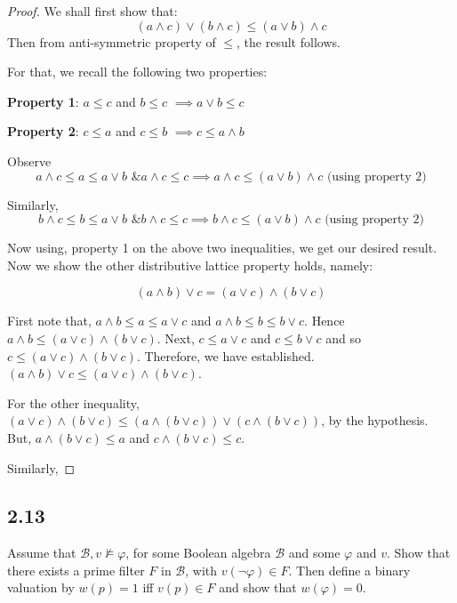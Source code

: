 \documentclass[12pt]{article}
\begin{document}
\begin{proof}
We shall first show that:
$$(a \wedge c) \vee (b \wedge c) \leq (a \vee b) \wedge c$$ 
Then from anti-symmetric property of $\leq$, the result follows.

For that, we recall the following two properties:

\textbf{Property 1}: $a \leq c$ and $b \leq c$ $\implies a \vee b \leq c$

\textbf{Property 2}: $c \leq a$ and $c \leq b$ $\implies c \leq a \wedge b$

Observe 
$$a \wedge c \leq a \leq a \vee b \text{ \& } a \wedge c \leq c \implies a \wedge c \leq (a \vee b) \wedge c \text{ (using property 2)}$$

Similarly,
$$b \wedge c \leq b \leq a \vee b \text{ \& } b \wedge c \leq c \implies b \wedge c \leq (a \vee b) \wedge c \text{ (using property 2)}$$

Now using, property 1 on the above two inequalities, we get our desired result. \\

Now we show the other distributive lattice property holds, namely:

$$(a \wedge b) \vee c = (a \vee c) \wedge (b \vee c)$$

First note that, $a \wedge b \leq a \leq a \vee c$ and $a \wedge b \leq b \leq b \vee c$. Hence $a \wedge b \leq (a \vee c) \wedge (b \vee c)$. Next, $c \leq a \vee c$ and $c \leq b \vee c$ and so $c \leq (a \vee c) \wedge (b \vee c)$. Therefore, we have established. $(a \wedge b) \vee c \leq (a \vee c) \wedge (b \vee c)$.

For the other inequality, $(a \vee c) \wedge (b \vee c) \leq (a \wedge (b \vee c)) \vee (c \wedge (b \vee c))$, by the hypothesis. But, $a \wedge (b \vee c) \leq a$ and $c \wedge (b \vee c) \leq c$.

Similarly, 

\end{proof}

\subsection*{2.13}
Assume that $\mathcal{B}, v \not \vDash \varphi$, for some Boolean algebra $\mathcal{B}$ and some $\varphi$ and $v$. Show that there exists a prime filter $F$ in $\mathcal{B}$, with $v(\neg \varphi) \in F$. Then define a binary valuation by $w(p) = 1$ iff $v(p) \in F$ and show that $w(\varphi) = 0$. \\
\end{document}

